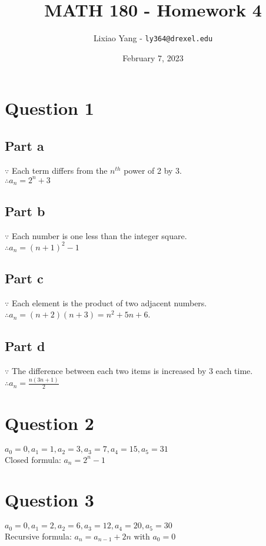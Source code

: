 \documentclass[11pt, oneside]{article}   	%
\title{\bf MATH 180 - Homework 4}
\author{Lixiao Yang - \texttt{ly364@drexel.edu}}
\date{February 7, 2023}							%
\begin{document}
\maketitle

\section*{Question 1}

	\subsection*{Part a}
	$\because$ Each term differs from the $n^{th}$ power of 2 by 3.\\
	$\therefore a_{n}=2^{n}+3$

	\subsection*{Part b}
	$\because$ Each number is one less than the integer square.\\
	$\therefore a_{n}=(n+1)^{2}-1$

	\subsection*{Part c}
	$\because$ Each element is the product of two adjacent numbers.\\
	$\therefore a_{n}=(n+2)(n+3)=n^{2}+5n+6$.

	\subsection*{Part d}
	$\because$ The difference between each two items is increased by 3 each time.\\
	$\therefore a_{n}=\frac{n(3n+1)}{2}$

\section*{Question 2}

	$a_{0}=0, a_{1}=1, a_{2}=3, a_{3}=7, a_{4}=15, a_{5}=31$\\
	Closed formula: $a_{n}=2^{n}-1$

\section*{Question 3}

	$a_{0}=0, a_{1}=2, a_{2}=6, a_{3}=12, a_{4}=20, a_{5}=30$\\
	Recursive formula: $a_{n}=a_{n-1}+2n$ with $a_{0}=0$
\end{document}

